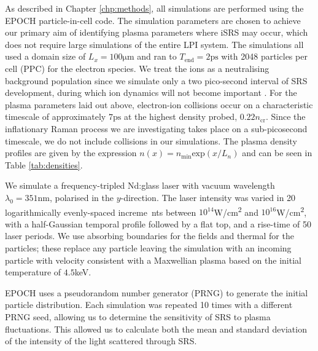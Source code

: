 As described in Chapter \ref{chp:methods}, all simulations are performed using the EPOCH \cite{Arber2015} particle-in-cell code. The simulation parameters are chosen to achieve our primary aim of identifying plasma parameters where iSRS may occur, which does not require large simulations of the entire LPI system. The simulations all used a domain size of $L_x = 100\si{\micro\metre} $ and ran to $T_\mathrm{end} = 2\si{\pico\second}$
with 2048
particles per cell (PPC) for the electron species.
We treat the ions as a neutralising background population since we simulate only a two pico-second interval of SRS
development, during which ion dynamics will not become important \cite{Rousseaux2006}.
For the plasma parameters laid out above, electron-ion collisions occur on a characteristic timescale of approximately
$7 \si{\pico\second}$ at the highest density probed, $0.22n_\mathrm{cr}$. Since the inflationary Raman process we
are investigating takes place
on a sub-picosecond timescale, we do not include collisions in our simulations.
The plasma density profiles are given by the expression $n(x) = n_\mathrm{min}\mathrm{exp}(x/L_n)$ and can be seen in Table
\ref{tab:densities}.

We simulate a frequency-tripled Nd:glass laser with vacuum wavelength $\lambda_0 = 351\si{\nano\metre}$, polarised in the $y$-direction. The laser intensity was varied in 20 logarithmically evenly-spaced increme\
nts between $10^{14}$\si{W/\centi\metre^2} and $10^{16}$\si{W/\centi\metre^2}, with a half-Gaussian temporal profile followed by a flat top, and a rise-time of 50 laser periods.
We use absorbing boundaries for the fields and thermal for the particles; these replace any particle leaving the
simulation with an incoming particle with velocity consistent with a Maxwellian plasma based on the initial temperature of $4.5$\si{keV}.



EPOCH uses a pseudorandom number generator (PRNG) to generate the initial particle distribution.
Each simulation was repeated 10 times with a different PRNG seed, allowing us to determine the sensitivity of
SRS to plasma fluctuations.
This allowed us to calculate both the mean and standard deviation of the intensity of the light scattered through SRS.

